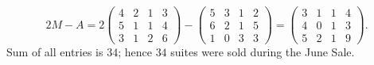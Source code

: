 \begin{Exercise}
	\begin{solution}
		$$
		2M - A
		= 2\begin{pmatrix}
		4 & 2 & 1 & 3 \\
		5 & 1 & 1 & 4 \\
		3 & 1 & 2 & 6
		\end{pmatrix} - \begin{pmatrix}
		5 & 3 & 1 & 2 \\
		6 & 2 & 1 & 5 \\
		1 & 0 & 3 & 3
		\end{pmatrix}
		= \begin{pmatrix}
		3 & 1 & 1 & 4 \\
		4 & 0 & 1 & 3 \\
		5 & 2 & 1 & 9
		\end{pmatrix}.
		$$
		Sum of all entries is $34$; hence $34$ suites were sold during the June Sale.
	\end{solution}
\end{Exercise}